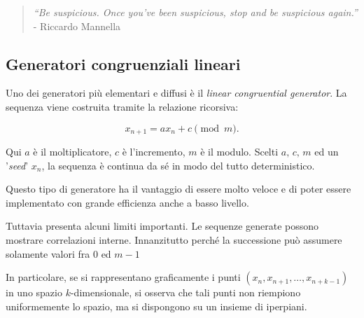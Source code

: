 \begin{quote}
	\emph{``Be suspicious. Once you've been suspicious, stop and be suspicious again.''}\\
	\hfill - Riccardo Mannella
\end{quote}

\vspace{0.5cm}
\subsection{Generatori congruenziali lineari}

Uno dei generatori più elementari e diffusi è il \emph{linear congruential generator}. La sequenza viene costruita tramite la relazione ricorsiva:

\[
x_{n+1} = a x_n + c \pmod m .
\]

Qui $a$ è il moltiplicatore, $c$ è l'incremento, $m$ è il modulo. Scelti $a,\, c,\, m$ ed un '\emph{seed}' $x_n$, la sequenza è continua da sé in modo del tutto deterministico.

Questo tipo di generatore ha il vantaggio di essere molto veloce e di poter essere implementato con grande efficienza anche a basso livello.

Tuttavia presenta alcuni limiti importanti. Le sequenze generate possono mostrare correlazioni interne. Innanzitutto perché la successione può assumere solamente valori fra 0 ed $m-1$

In particolare, se si rappresentano graficamente i punti $(x_n, x_{n+1}, \dots, x_{n+k-1})$ in uno spazio $k$-dimensionale, si osserva che tali punti non riempiono uniformemente lo spazio, ma si dispongono su un insieme di iperpiani.

